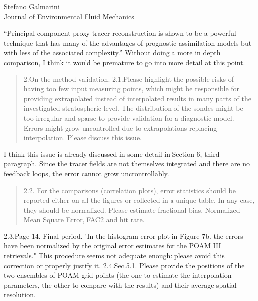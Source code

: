 \documentclass{letter}
\begin{document}
\begin{letter}{Stefano Galmarini\\
Journal of Environmental Fluid Mechanics}
\begin{quote}
\end{quote}
``Principal component proxy tracer reconstruction is shown to be a powerful
technique that 
has many of the advantages of prognostic assimilation models but with
less of the associated complexity.''
Without doing a more in depth comparison, 
I think it would be premature to go into more detail at this point.
\begin{quote}
2.On the method validation.
2.1.Please highlight the possible risks of having too few input measuring points, which might be responsible for providing extrapolated instead of interpolated results in many parts of the investigated stratospheric level. The distribution of the sondes might be too irregular and sparse to provide validation for a diagnostic model. Errors might grow uncontrolled due to extrapolations replacing interpolation. Please discuss this issue.
\end{quote}
I think this issue is already discussed in some detail in Section 6, third
paragraph.
Since the tracer fields are not themselves integrated and there are no feedback loops, the error
cannot grow uncrontrollably.
\begin{quote}
2.2. For the comparisons (correlation plots), error statistics should be reported either on all the figures or collected in a unique table. In any case, they should be normalized. Please estimate fractional bias, Normalized Mean Square Error, FAC2 and hit rate.
\end{quote}
2.3.Page 14. Final period. "In the histogram error plot in Figure 7b. the errors have been normalized by the original error estimates for the POAM III retrievals." This procedure seems not adequate enough: please avoid this correction or properly justify it.
2.4.Sec.5.1. Please provide the positions of the two ensembles of POAM grid points (the one to estimate the interpolation parameters, the other to compare with the results) and their average spatial resolution.


\end{letter}
\end{document}
